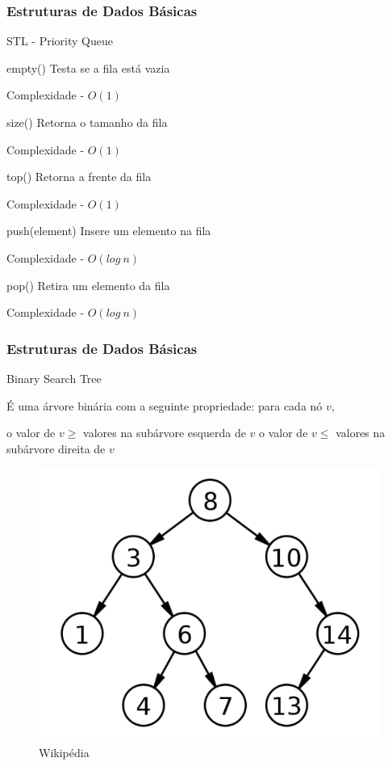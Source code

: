 \begin{frame}
\frametitle{Estruturas de Dados Básicas}
\begin{block}{STL - Priority Queue}
\begin{itemize}
	\bitem empty() Testa se a fila está vazia
	\begin{itemize}
		\bitem Complexidade - $O(1)$
	\end{itemize}
	\bitem size() Retorna o tamanho da fila
	\begin{itemize}
		\bitem Complexidade - $O(1)$
	\end{itemize}
	\bitem top() Retorna a frente da fila
	\begin{itemize}
		\bitem Complexidade - $O(1)$
	\end{itemize}
	\bitem push(element) Insere um elemento na fila
	\begin{itemize}
		\bitem Complexidade - $O(log\ n)$
	\end{itemize}
	\bitem pop() Retira um elemento da fila
	\begin{itemize}
		\bitem Complexidade - $O(log\ n)$
	\end{itemize}
\end{itemize}
\end{block}
\end{frame}

\begin{frame}
\frametitle{Estruturas de Dados Básicas}
\begin{block}{Binary Search Tree}
	\begin{itemize}
		\bitem É uma árvore binária com a seguinte propriedade: para cada nó $v$,
		\begin{itemize}
			\bitem o valor de $v \geq$ valores na subárvore esquerda de $v$
			\bitem  o valor de $v \leq$ valores na subárvore direita de $v$
		\end{itemize}
	\end{itemize}

	\begin{center}
		\begin{figure}
			\includegraphics[width=.42\textwidth]{figuras/BST.png}
			\caption{Wikipédia}
		\end{figure}
	\end{center}
\end{block}
\end{frame}

